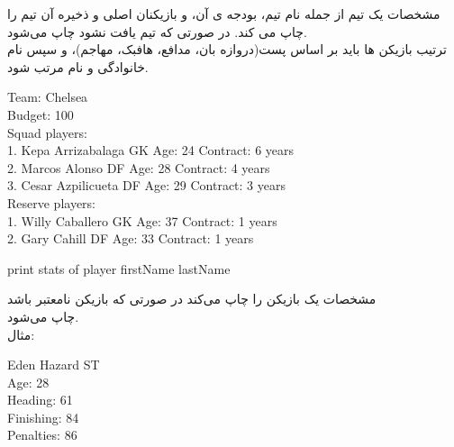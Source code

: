 \documentclass[]{article}
\begin{document}
مشخصات یک تیم از جمله نام تیم، بودجه ی آن، و بازیکنان اصلی و ذخیره آن 
تیم را چاپ می کند. در صورتی که تیم یافت نشود  ﭼﺎپ ﻣﯽﺷﻮد. 
\\
ترتیب بازیکن ها باید بر اساس پست(دروازه بان، مدافع، هافبک، مهاجم)، و 
سپس نام خانوادگی و نام مرتب شود.
\begin{tcolorbox}[boxrule=0pt]
	\begin{latin}
		\large{
			
			Team: Chelsea\\
			Budget: 100\\
			Squad players:\\
			1. Kepa Arrizabalaga GK Age: 24 Contract: 6 years\\
			2. Marcos Alonso DF Age: 28 Contract: 4 years\\
			3. Cesar Azpilicueta DF Age: 29 Contract: 3 years\\
			Reserve players:\\
			1. Willy Caballero GK Age: 37 Contract: 1 years\\
			2. Gary Cahill DF Age: 33 Contract: 1 years
			
		}
	\end{latin}
\end{tcolorbox}

\hrulefill

\begin{tcolorbox}[boxrule=0pt]
	\begin{latin}
		\large{
			print stats of player firstName lastName
		}
	\end{latin}
\end{tcolorbox}

ﻣﺸﺨﺼﺎت ﯾﮏ ﺑﺎزﯾﮑﻦ را ﭼﺎپ ﻣﯽﮐﻨﺪ در ﺻﻮرﺗﯽ ﮐﻪ ﺑﺎزﯾﮑﻦ ﻧﺎﻣﻌﺘﺒﺮ ﺑﺎﺷﺪ \\
 چاپ ﻣﯽﺷﻮد.
\\
مثال:
\begin{tcolorbox}[boxrule=0pt]
	\begin{latin}
		\large{
			Eden Hazard ST\\
			Age: 28\\
			Heading: 61\\
			Finishing: 84\\
			Penalties: 86
		}
	\end{latin}
\end{tcolorbox}

\hrulefill
\end{document}
